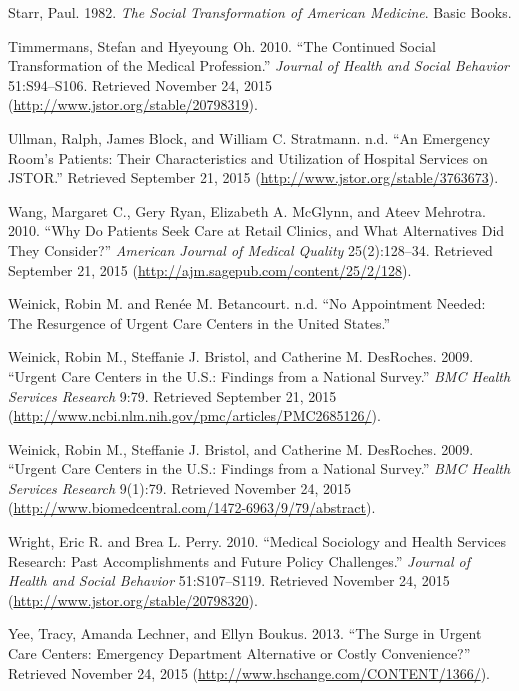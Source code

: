 \documentclass[12pt,twoside]{reedthesis}
\begin{document}
  \hypertarget{ref-starrux5fsocialux5f1982}{}
  Starr, Paul. 1982. \emph{The Social Transformation of American
  Medicine}. Basic Books.
  
  \hypertarget{ref-timmermansux5fcontinuedux5f2010}{}
  Timmermans, Stefan and Hyeyoung Oh. 2010. ``The Continued Social
  Transformation of the Medical Profession.'' \emph{Journal of Health and
  Social Behavior} 51:S94--S106. Retrieved November 24, 2015
  (\url{http://www.jstor.org/stable/20798319}).
  
  \hypertarget{ref-ullmanux5fPATIENTS}{}
  Ullman, Ralph, James Block, and William C. Stratmann. n.d. ``An
  Emergency Room's Patients: Their Characteristics and Utilization of
  Hospital Services on JSTOR.'' Retrieved September 21, 2015
  (\url{http://www.jstor.org/stable/3763673}).
  
  \hypertarget{ref-wangux5fwhyux5f2010}{}
  Wang, Margaret C., Gery Ryan, Elizabeth A. McGlynn, and Ateev Mehrotra.
  2010. ``Why Do Patients Seek Care at Retail Clinics, and What
  Alternatives Did They Consider?'' \emph{American Journal of Medical
  Quality} 25(2):128--34. Retrieved September 21, 2015
  (\url{http://ajm.sagepub.com/content/25/2/128}).
  
  \hypertarget{ref-WEINECKux5fNOAPPT}{}
  Weinick, Robin M. and Renée M. Betancourt. n.d. ``No Appointment Needed:
  The Resurgence of Urgent Care Centers in the United States.''
  
  \hypertarget{ref-WEINECKux5f2009}{}
  Weinick, Robin M., Steffanie J. Bristol, and Catherine M. DesRoches.
  2009. ``Urgent Care Centers in the U.S.: Findings from a National
  Survey.'' \emph{BMC Health Services Research} 9:79. Retrieved September
  21, 2015 (\url{http://www.ncbi.nlm.nih.gov/pmc/articles/PMC2685126/}).
  
  \hypertarget{ref-weinickux5furgentux5f2009-1}{}
  Weinick, Robin M., Steffanie J. Bristol, and Catherine M. DesRoches.
  2009. ``Urgent Care Centers in the U.S.: Findings from a National
  Survey.'' \emph{BMC Health Services Research} 9(1):79. Retrieved
  November 24, 2015
  (\url{http://www.biomedcentral.com/1472-6963/9/79/abstract}).
  
  \hypertarget{ref-wrightux5fmedicalux5f2010}{}
  Wright, Eric R. and Brea L. Perry. 2010. ``Medical Sociology and Health
  Services Research: Past Accomplishments and Future Policy Challenges.''
  \emph{Journal of Health and Social Behavior} 51:S107--S119. Retrieved
  November 24, 2015 (\url{http://www.jstor.org/stable/20798320}).
  
  \hypertarget{ref-yeeux5fsurgeux5f2013}{}
  Yee, Tracy, Amanda Lechner, and Ellyn Boukus. 2013. ``The Surge in
  Urgent Care Centers: Emergency Department Alternative or Costly
  Convenience?'' Retrieved November 24, 2015
  (\url{http://www.hschange.com/CONTENT/1366/}).


\end{document}
